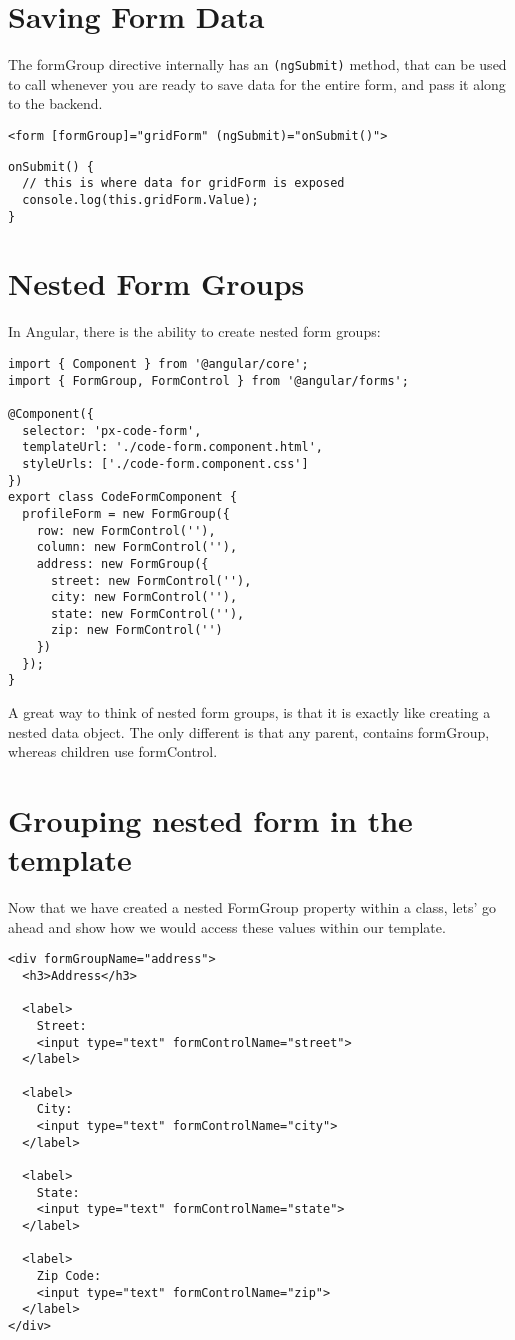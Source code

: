 \section{Saving Form Data}
The formGroup directive internally has an \lstinline{(ngSubmit)} method, that 
can be used to call whenever you are ready to save data for the entire form, 
and pass it along to the backend. 
\begin{lstlisting}[caption=code-form.component.html]
<form [formGroup]="gridForm" (ngSubmit)="onSubmit()">
\end{lstlisting}

\begin{lstlisting}[caption=grid-form.component.ts]
onSubmit() {
  // this is where data for gridForm is exposed
  console.log(this.gridForm.Value);
}
\end{lstlisting}

\section{ Nested Form Groups }
In Angular, there is the ability to create nested form groups: 

\begin{lstlisting}[caption=px-code-form.component.ts]
import { Component } from '@angular/core';
import { FormGroup, FormControl } from '@angular/forms';

@Component({
  selector: 'px-code-form',
  templateUrl: './code-form.component.html',
  styleUrls: ['./code-form.component.css']
})
export class CodeFormComponent {
  profileForm = new FormGroup({
    row: new FormControl(''),
    column: new FormControl(''),
    address: new FormGroup({
      street: new FormControl(''),
      city: new FormControl(''),
      state: new FormControl(''),
      zip: new FormControl('')
    })
  });
}
\end{lstlisting}

A great way to think of nested form groups, is that it is exactly like creating 
a nested data object. The only different is that any parent, contains formGroup, 
whereas children use formControl. 

\section{ Grouping nested form in the template } 
Now that we have created a nested FormGroup property within a class, lets' go
ahead and show how we would access these values within our template.
\begin{lstlisting}
<div formGroupName="address">
  <h3>Address</h3>

  <label>
    Street:
    <input type="text" formControlName="street">
  </label>

  <label>
    City:
    <input type="text" formControlName="city">
  </label>
  
  <label>
    State:
    <input type="text" formControlName="state">
  </label>

  <label>
    Zip Code:
    <input type="text" formControlName="zip">
  </label>
</div>
\end{lstlisting}

